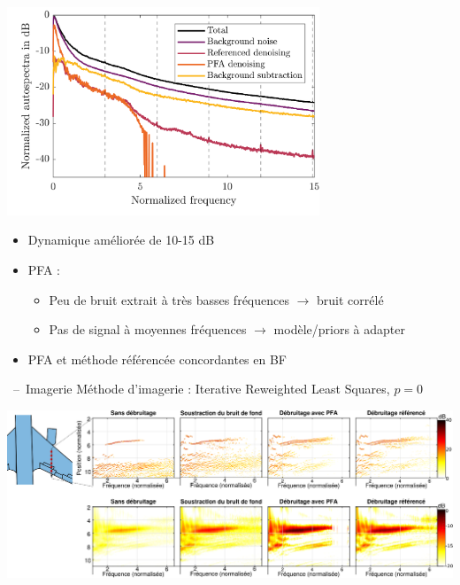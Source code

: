 \documentclass[10pt,xcolor=x11names,compress, show notes]{beamer}%
\begin{document}
\begin{frame}{\insertsectionhead}
	\centering
	\includegraphics[width=0.7\textwidth]{airbus/mean_as.png}\\
	\vfill
		\begin{itemize}
        		\item Dynamique améliorée de 10-15 dB
        		\item PFA :        \begin{itemize}
       		 	\item Peu de bruit extrait à très basses fréquences $\rightarrow$ bruit corrélé
       		 	\item Pas de signal à moyennes fréquences $\rightarrow$ modèle/priors à adapter
		\end{itemize}
		\item PFA et méthode référencée concordantes en BF
		
	\end{itemize}
\end{frame}


\begin{frame}[t]{\insertsectionhead~--~Imagerie}
Méthode d'imagerie : Iterative Reweighted Least Squares, $p=0$
\vfill
\begin{minipage}{1.1\textwidth}
	\hspace{-0.65cm}\includegraphics[width=\textwidth]{airbus/imagerie_final.eps}
\end{minipage}
\end{frame}
\end{document}
